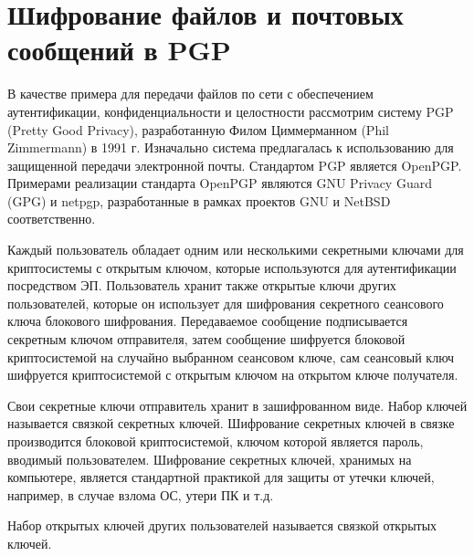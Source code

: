 \section{Шифрование файлов и почтовых сообщений в PGP}

В качестве примера для передачи файлов по сети с обеспечением аутентификации, конфиденциальности и целостности рассмотрим систему PGP (Pretty Good Privacy), разработанную Филом Циммерманном (Phil Zimmermann) в 1991 г. Изначально система предлагалась к использованию для защищенной передачи электронной почты. Стандартом PGP является OpenPGP. Примерами реализации стандарта OpenPGP являются GNU Privacy Guard (GPG) и netpgp, разработанные в рамках проектов GNU и NetBSD соответственно.

Каждый пользователь обладает одним или несколькими секретными ключами для криптосистемы с открытым ключом, которые используются для аутентификации посредством ЭП. Пользователь хранит также открытые ключи других пользователей, которые он использует для шифрования секретного сеансового ключа блокового шифрования. Передаваемое сообщение подписывается секретным ключом отправителя, затем сообщение шифруется блоковой криптосистемой на случайно выбранном сеансовом ключе, сам сеансовый ключ шифруется криптосистемой с открытым ключом на открытом ключе получателя.

Свои секретные ключи отправитель хранит в зашифрованном виде. Набор ключей называется связкой секретных ключей. Шифрование секретных ключей в связке производится блоковой криптосистемой, ключом которой является пароль, вводимый пользователем. Шифрование секретных ключей, хранимых на компьютере, является стандартной практикой для защиты от утечки ключей, например, в случае взлома ОС, утери ПК и т.д.

Набор открытых ключей других пользователей называется связкой открытых ключей.

